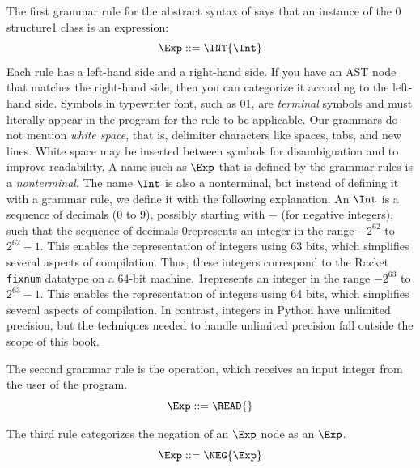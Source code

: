 \documentclass[7x10]{TimesAPriori_MIT}%
\def\racketEd{0}
\def\pythonEd{1}
\providecommand{\BookEdition}{1}
\let\edition\BookEdition
\newcommand{\racket}[1]{{\if\edition\racketEd{#1}\fi}}
\newcommand{\pythonColor}[0]{}
\newcommand{\python}[1]{{\if\edition\pythonEd\pythonColor #1\fi}}
\numberwithin{theorem}{chapter}
\numberwithin{definition}{chapter}
\numberwithin{equation}{chapter}
\begin{document}
The first grammar rule for the abstract syntax of \LangInt{} says that an
instance of the \racket{ structure}\python{ class} is an expression:
\begin{equation}
\Exp ::= \INT{\Int}  \label{eq:arith-int}
\end{equation}
%
Each rule has a left-hand side and a right-hand side.
If you have an AST node that matches the
right-hand side, then you can categorize it according to the
left-hand side.
%
Symbols in typewriter font, such as \racket{}\python{},
are \emph{terminal} symbols and must literally appear in the program for the
rule to be applicable.
%
Our grammars do not mention \emph{white space}, that is, delimiter
characters like spaces, tabs, and new lines. White space may be
inserted between symbols for disambiguation and to improve
readability.  
%
A name such as $\Exp$ that is defined by the grammar rules is a
\emph{nonterminal}.  
%
The name $\Int$ is also a nonterminal, but instead of defining it with
a grammar rule, we define it with the following explanation.  An
$\Int$ is a sequence of decimals ($0$ to $9$), possibly starting with
$-$ (for negative integers), such that the sequence of decimals
%
\racket{represents an integer in the range $-2^{62}$ to $2^{62}-1$.  This
enables the representation of integers using 63 bits, which simplifies
several aspects of compilation.
%
Thus, these integers correspond to the Racket \texttt{fixnum}
datatype on a 64-bit machine.}
%
\python{represents an integer in the range $-2^{63}$ to $2^{63}-1$.  This
enables the representation of integers using 64 bits, which simplifies
several aspects of compilation. In contrast, integers in Python have
unlimited precision, but the techniques needed to handle unlimited
precision fall outside the scope of this book.}

The second grammar rule is the \READOP{} operation, which receives an
input integer from the user of the program.
\begin{equation}
  \Exp ::= \READ{} \label{eq:arith-read}
\end{equation}

The third rule categorizes the negation of an $\Exp$ node as an
$\Exp$.
\begin{equation}
  \Exp ::= \NEG{\Exp}  \label{eq:arith-neg}
\end{equation}
\end{document}
